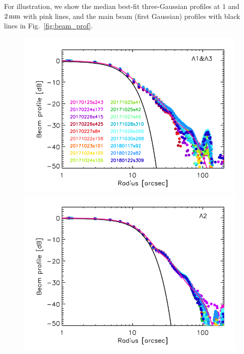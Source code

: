 {\lp For illustration, we show the median best-fit
three-Gaussian profiles at $1$ and $2\,\rm{mm}$ with pink lines, and
the main beam (first Gaussian) profiles with black lines in
Fig.~\ref{fig:beam_prof}. }


\begin{figure}[!thbp]
  \centering
   \includegraphics[clip, width=\linewidth]{Figures/plot_profiles_dB_1mm.pdf}
   \includegraphics[clip, width=\linewidth]{Figures/plot_profiles_dB_a2.pdf}

\end{figure}
